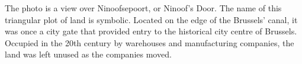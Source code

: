 \documentclass{article}[11pt]
\begin{document}

The photo is a view over Ninoofsepoort, or Ninoof's Door. The name of this triangular plot of land is symbolic. Located on the edge of the Brussels' canal, it was once a city gate that provided entry to the historical city centre of Brussels. Occupied in the 20th century by warehouses and manufacturing companies, the land was left unused as the companies moved.
\end{document}
